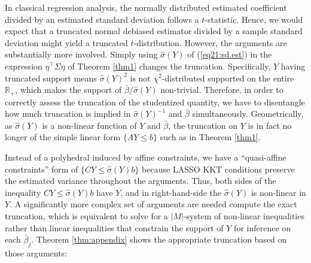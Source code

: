 \documentclass[11pt]{article}
\newcommand{\RR}{\mathbb{R}}
\begin{document}
In classical regression analysis, the normally distributed estimated coefficient divided by an estimated standard deviation follows a $t$-statistic. Hence, we would expect that a truncated normal debiased estimator divided by a sample standard deviation might yield a truncated $t$-distribution. However, the arguments are substantially more involved. Simply using $\hat{\sigma}(Y)$ of (\ref{eq21:sd.est}) in the expression $\eta^\top\Sigma\eta$ of Theorem \ref{thm1} changes the truncation. Specifically, $Y$ having truncated support means $\hat{\sigma}(Y)^2$ is not $\chi^2$-distributed supported on the entire $\RR_+$, which makes the support of $\bar{\beta}/\hat{\sigma}(Y)$ non-trivial. Therefore, in order to correctly assess the truncation of the studentized quantity,  we have to disentangle how much truncation is implied in $\hat{\sigma}(Y)^{-1}$ and $\bar{\beta}$ simultaneously. Geometrically, as $\hat{\sigma}(Y)$ is a non-linear function of $Y$ and $\bar{\beta}$, the truncation on $Y$ is in fact no longer of the simple linear form $\{AY\leq b\}$ such as in Theorem \ref{thm1}.

Instead of a polyhedral induced by affine constraints, we have a ``quasi-affine constraints'' form of $\{C Y\leq \hat{\sigma}(Y) b\}$ because LASSO KKT conditions preserve the estimated variance throughout the arguments. Thus, both sides of the inequality $CY\leq \hat{\sigma}(Y)b$ have $Y$, and in right-hand-side the $\hat{\sigma}(Y)$ is non-linear in $Y$. A significantly more complex set of arguments are needed compute the exact truncation, which is equivalent to solve for a $|M|$-system of non-linear inequalities rather than linear inequalities that constrain the support of $Y$ for inference on each $\bar{\beta}_j$. Theorem \ref{thm:appendix} shows the appropriate truncation based on those arguments:
\end{document}
